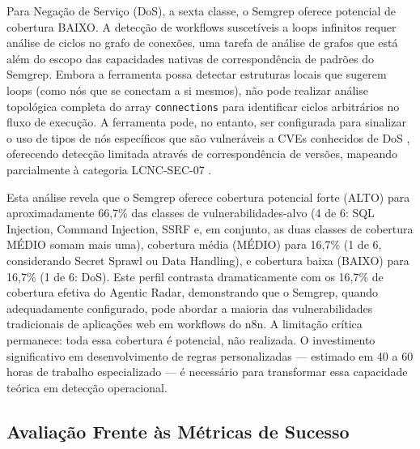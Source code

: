 \documentclass{sftex}
\begin{document}
Para Negação de Serviço (DoS), a sexta classe, o Semgrep oferece potencial de cobertura BAIXO. A detecção de workflows suscetíveis a loops infinitos requer análise de ciclos no grafo de conexões, uma tarefa de análise de grafos que está além do escopo das capacidades nativas de correspondência de padrões do Semgrep. Embora a ferramenta possa detectar estruturas locais que sugerem loops (como nós que se conectam a si mesmos), não pode realizar análise topológica completa do array \texttt{connections} para identificar ciclos arbitrários no fluxo de execução. A ferramenta pode, no entanto, ser configurada para sinalizar o uso de tipos de nós específicos que são vulneráveis a CVEs conhecidos de DoS \cite{cve_2023_27562} \cite{cve_2025_49595}, oferecendo detecção limitada através de correspondência de versões, mapeando parcialmente à categoria LCNC-SEC-07 \cite{owasp_lcnc_sec_07}.

Esta análise revela que o Semgrep oferece cobertura potencial forte (ALTO) para aproximadamente 66,7\% das classes de vulnerabilidades-alvo (4 de 6: SQL Injection, Command Injection, SSRF e, em conjunto, as duas classes de cobertura MÉDIO somam mais uma), cobertura média (MÉDIO) para 16,7\% (1 de 6, considerando Secret Sprawl ou Data Handling), e cobertura baixa (BAIXO) para 16,7\% (1 de 6: DoS). Este perfil contrasta dramaticamente com os 16,7\% de cobertura efetiva do Agentic Radar, demonstrando que o Semgrep, quando adequadamente configurado, pode abordar a maioria das vulnerabilidades tradicionais de aplicações web em workflows do n8n. A limitação crítica permanece: toda essa cobertura é potencial, não realizada. O investimento significativo em desenvolvimento de regras personalizadas — estimado em 40 a 60 horas de trabalho especializado — é necessário para transformar essa capacidade teórica em detecção operacional.

\subsection{Avaliação Frente às Métricas de Sucesso}
\end{document}
